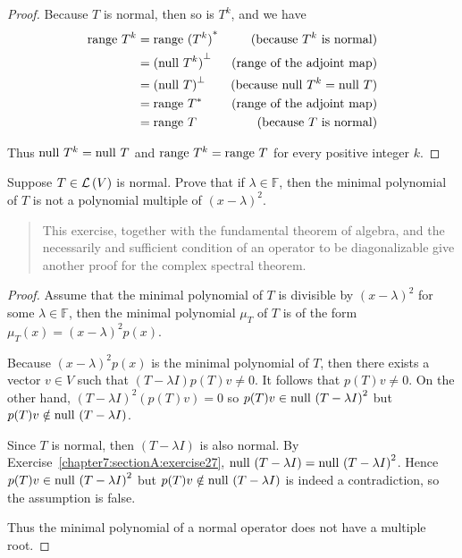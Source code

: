 \begin{proof}
    Because $T$ is normal, then so is $T^{k}$, and we have
    \begin{align*}
        \operatorname{range}\,{T^{k}} & = \operatorname{range}\,{(T^{k})}^{*}       & \text{(because $T^{k}$ is normal)}             \\
                      & = {(\operatorname{null}\,{T^{k}})}^{\bot} & \text{(range of the adjoint map)}              \\
                      & = {(\operatorname{null}\,{T})}^{\bot}     & \text{(because $\operatorname{null}\,{T^{k}} = \operatorname{null}\,{T}$)} \\
                      & = \operatorname{range}\,{T^{*}}             & \text{(range of the adjoint map)}              \\
                      & = \operatorname{range}\,{T}                 & \text{(because $T$ is normal)}
    \end{align*}

    Thus $\operatorname{null}\,{T^{k}} = \operatorname{null}\,{T}$ and $\operatorname{range}\,{T^{k}} = \operatorname{range}\,{T}$ for every positive integer $k$.
\end{proof}
\newpage

\begin{exercise}
    Suppose $T\in\mathcal{L}\left({V}\right)$ is normal. Prove that if $\lambda\in\mathbb{F}$, then the minimal polynomial of $T$ is not a polynomial multiple of ${(x - \lambda)}^{2}$.
\end{exercise}

\begin{quote}
    This exercise, together with the fundamental theorem of algebra, and the necessarily and sufficient condition of an operator to be diagonalizable give another proof for the complex spectral theorem.
\end{quote}

\begin{proof}
    Assume that the minimal polynomial of $T$ is divisible by ${(x - \lambda)}^{2}$ for some $\lambda\in\mathbb{F}$, then the minimal polynomial $\mu_{T}$ of $T$ is of the form $\mu_{T}(x) = {(x - \lambda)}^{2}p(x)$.

    Because ${(x - \lambda)}^{2}p(x)$ is the minimal polynomial of $T$, then there exists a vector $v\in V$ such that $(T - \lambda I)p(T)v \ne 0$. It follows that $p(T)v \ne 0$. On the other hand, ${(T - \lambda I)}^{2}(p(T)v) = 0$ so $p(T)v\in \operatorname{null}\,{{(T - \lambda I)}^{2}}$ but $p(T)v\notin \operatorname{null}\,{(T - \lambda I)}$.

    Since $T$ is normal, then $(T - \lambda I)$ is also normal. By Exercise~\ref{chapter7:sectionA:exercise27}, $\operatorname{null}\,{(T - \lambda I)} = \operatorname{null}\,{{(T - \lambda I)}^{2}}$. Hence $p(T)v\in \operatorname{null}\,{{(T - \lambda I)}^{2}}$ but $p(T)v\notin \operatorname{null}\,{(T - \lambda I)}$ is indeed a contradiction, so the assumption is false.

    Thus the minimal polynomial of a normal operator does not have a multiple root.
\end{proof}
\newpage

